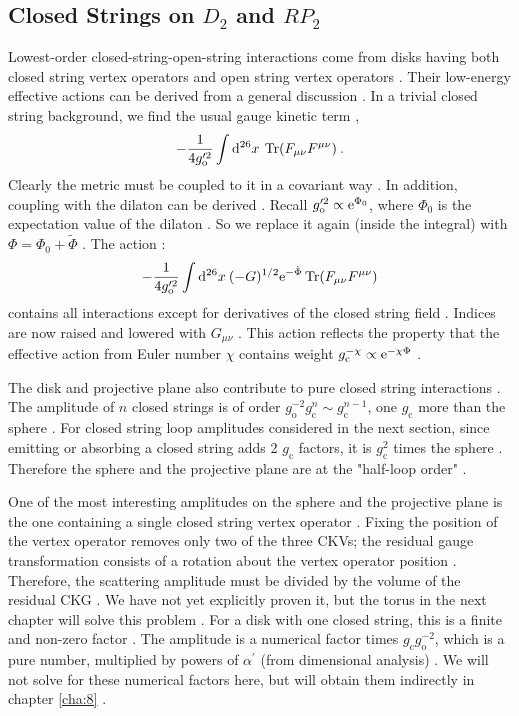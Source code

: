 \subsection*{Closed Strings on $D_{2}$ and $RP_{2}$}
Lowest-order closed-string-open-string interactions come from disks having both closed string vertex operators and open string vertex operators . Their low-energy effective actions can be derived from a general discussion . In a trivial closed string background, we find the usual gauge kinetic term ,
\begin{equation}
	-\frac{1}{4 g_{\mathrm{o}}^{\prime 2}} \int \mathrm{d}^{26} x\: \operatorname{Tr}(F_{\mu \nu} F^{\mu \nu}) \:. \label{6.6.26}
\end{equation}
Clearly the metric must be coupled to it in a covariant way . In addition, coupling with the dilaton can be derived . Recall $g_{\mathrm{o}}^{\prime 2} \propto \mathrm{e}^{\Phi_{0}}$, where $\Phi_{0}$ is the expectation value of the dilaton . So we replace it again (inside the integral) with $\Phi=\Phi_{0}+\tilde{\Phi}$ . The action :
\begin{equation}
	-\frac{1}{4 g_{\mathrm{o}}^{\prime 2}} \int \mathrm{d}^{26} x \: (-G)^{1/2} \mathrm{e}^{-\tilde{\Phi}} \operatorname{Tr}(F_{\mu \nu} F^{\mu \nu}) \label{6.6.27}
\end{equation}
contains all interactions except for derivatives of the closed string field . Indices are now raised and lowered with $G_{\mu \nu}$ . This action reflects the property that the effective action from Euler number $\chi$ contains weight $g_{\mathrm{c}}^{-\chi} \propto \mathrm{e}^{-\chi \Phi}$ .

The disk and projective plane also contribute to pure closed string interactions . The amplitude of $n$ closed strings is of order $g_{\mathrm{o}}^{-2} g_{\mathrm{c}}^{n} \sim g_{\mathrm{c}}^{n-1}$, one $g_{\mathrm{c}}$ more than the sphere . For closed string loop amplitudes considered in the next section, since emitting or absorbing a closed string adds 2 $g_{\mathrm{c}}$ factors, it is $g_{\mathrm{c}}^{2}$ times the sphere . Therefore the sphere and the projective plane are at the "half-loop order" .

One of the most interesting amplitudes on the sphere and the projective plane is the one containing a single closed string vertex operator . Fixing the position of the vertex operator removes only two of the three CKVs; the residual gauge transformation consists of a rotation about the vertex operator position . Therefore, the scattering amplitude must be divided by the volume of the residual CKG . We have not yet explicitly proven it, but the torus in the next chapter will solve this problem . For a disk with one closed string, this is a finite and non-zero factor . The amplitude is a numerical factor times $g_{\mathrm{c}} g_{\mathrm{o}}^{-2}$, which is a pure number, multiplied by powers of $\alpha^{\prime}$ (from dimensional analysis) . We will not solve for these numerical factors here, but will obtain them indirectly in chapter \ref{cha:8} .

